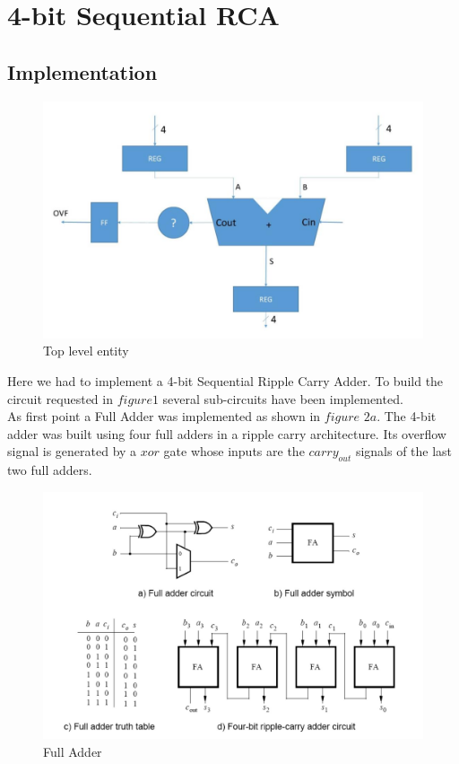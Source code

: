 \documentclass[12pt]{article}
\begin{document}

\section{4-bit Sequential RCA}
\subsection{Implementation}

\begin{figure}[h]
	\centering
	\includegraphics[scale = 0.8]{immagini/B1.jpg}
	\caption{Top level entity}
\end{figure}


Here we had to implement a 4-bit Sequential Ripple Carry Adder. To build the circuit requested in $figure 1$ several sub-circuits have been implemented.\\
As first point a Full Adder was implemented as shown in $figure$ $2a$. The 4-bit adder was built using four full adders in a ripple carry architecture. Its overflow signal is generated by a $xor$ gate whose inputs are the $carry_{out}$ signals of the last two full adders.\\

\begin{figure}[h]
	\centering
	\includegraphics[scale = 0.4]{immagini/B2.jpg}
	\caption{Full Adder}
\end{figure}
\end{document}
